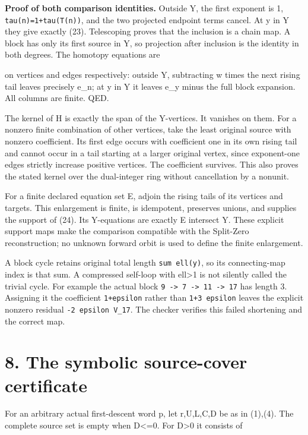 \textbf{Proof of both comparison identities.} Outside Y, the first
exponent is 1, \nolinkurl{tau(n)=1+tau(T(n))}, and the two projected
endpoint terms cancel. At y in Y they give exactly (23). Telescoping
proves that the inclusion is a chain map. A block has only its first
source in Y, so projection after inclusion is the identity in both
degrees. The homotopy equations are


on vertices and edges respectively: outside Y, subtracting w times the
next rising tail leaves precisely e\_n; at y in Y it leaves e\_y minus
the full block expansion. All columns are finite. QED.

The kernel of H is exactly the span of the Y-vertices. It vanishes on
them. For a nonzero finite combination of other vertices, take the least
original source with nonzero coefficient. Its first edge occurs with
coefficient one in its own rising tail and cannot occur in a tail
starting at a larger original vertex, since exponent-one edges strictly
increase positive vertices. The coefficient survives. This also proves
the stated kernel over the dual-integer ring without cancellation by a
nonunit.

For a finite declared equation set E, adjoin the rising tails of its
vertices and targets. This enlargement is finite, is idempotent,
preserves unions, and supplies the support of (24). Its Y-equations are
exactly E intersect Y. These explicit support maps make the comparison
compatible with the Split-Zero reconstruction; no unknown forward orbit
is used to define the finite enlargement.

A block cycle retains original total length \nolinkurl{sum ell(y)}, so
its connecting-map index is that sum. A compressed self-loop with
ell\textgreater1 is not silently called the trivial cycle. For example
the actual block \nolinkurl{9 -> 7 -> 11 -> 17} has length 3. Assigning
it the coefficient \nolinkurl{1+epsilon} rather than
\nolinkurl{1+3 epsilon} leaves the explicit nonzero residual
\nolinkurl{-2 epsilon V_17}. The checker verifies this failed shortening
and the correct map.

\section{8. The symbolic source-cover certificate}

For an arbitrary actual first-descent word p, let r,U,L,C,D be as in
(1),(4). The complete source set is empty when D\textless=0. For
D\textgreater0 it consists of

